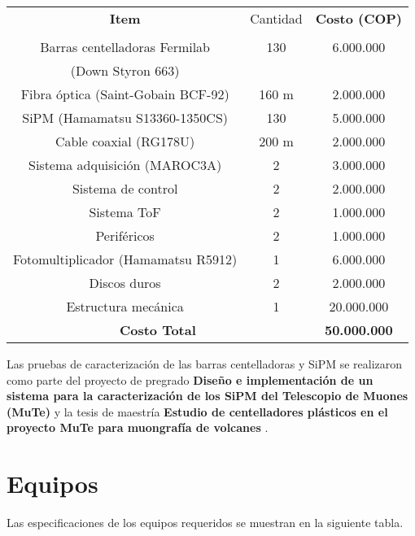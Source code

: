 \begin{tabular}{|c|c|c|}\hline
{\bf Item} 	& Cantidad & {\bf Costo (COP)} \\
		   & & \\\hline
Barras centelladoras Fermilab 	&  130 & 6.000.000 	\\
(Down Styron 663) &   & 	\\\hline
Fibra óptica (Saint-Gobain BCF-92)	        &  160 m & 2.000.000 	\\\hline
SiPM (Hamamatsu S13360-1350CS)	                &  130 & 5.000.000 	\\\hline
Cable coaxial	(RG178U)      &  200 m & 2.000.000 	\\\hline
Sistema adquisición	(MAROC3A)    &  2 & 3.000.000 	\\\hline
Sistema de control	    &  2 & 2.000.000 	\\\hline
Sistema ToF	            &  2 & 1.000.000 	\\\hline
Periféricos	            &  2 & 1.000.000 	\\\hline
Fotomultiplicador (Hamamatsu R5912)	    &  1 & 6.000.000 	\\\hline
Discos duros	        &  2 & 2.000.000 	\\\hline
Estructura mecánica     &  1    & 20.000.000 \\\hline
\multicolumn{2}{|c|}{\bf Costo Total} 						          & {\bf 50.000.000}					\\\hline
\end{tabular}

Las pruebas de caracterización de las barras centelladoras y SiPM se realizaron como parte del proyecto de pregrado 
\textbf{Diseño e implementación de un sistema para la caracterización de los SiPM del Telescopio de Muones (MuTe)} \cite{Villafrades2019} y la tesis de maestría \textbf{Estudio de centelladores plásticos en el proyecto MuTe para muongrafía de volcanes} \cite{Calderon2019}.

\section{Equipos}

Las especificaciones de los equipos requeridos se muestran en la siguiente tabla.\\

